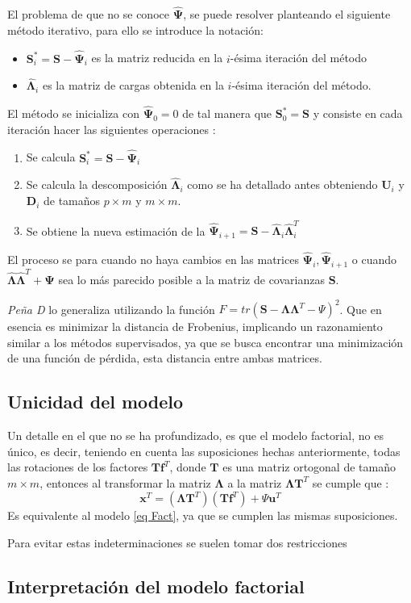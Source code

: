 \noindent El problema de que no se conoce $\mathbf{\hat{\Psi}}$, se puede resolver planteando el siguiente método iterativo, para ello se introduce la notación:
\begin{itemize}
\item $\mathbf{S}_i^*=\mathbf{S}-\hat{\mathbf{\Psi}}_i$ es la matriz reducida en la $i$-ésima iteración del método
\item $\mathbf{\hat{\Lambda}}_i$ es la matriz de cargas obtenida en la $i$-ésima iteración del método. 
\end{itemize}
\noindent El método se inicializa con $\mathbf{\hat{\Psi}}_0=0$ de tal manera que $\mathbf{S}_0^*=\mathbf{S}$ y consiste en cada iteración hacer las siguientes operaciones \cite{Johnson 2007, Peña 2002, Cuadras 2014}: 
\begin{enumerate}
\item Se calcula $\mathbf{S}_i^*=\mathbf{S-\hat{\Psi}}_i$
\item Se calcula la descomposición $\mathbf{\hat{\Lambda}}_i$ como se ha detallado antes obteniendo $\mathbf{U}_i$ y $\mathbf{D}_i$ de tamaños $p\times m $ y $m\times m$. 
\item Se obtiene la nueva estimación de la $\mathbf{\hat{\Psi}}_{i+1}=\mathbf{S}-\mathbf{\hat{\Lambda}}_i\mathbf{\hat{\Lambda}}_i^T$
\end{enumerate}

\noindent El proceso se para cuando no haya cambios en las matrices $\mathbf{\hat{\Psi}}_i,\mathbf{\hat{\Psi}}_{i+1}$ o cuando $\mathbf{\hat{\Lambda}}\mathbf{\hat{\Lambda}}^T+\mathbf{\Psi}$ sea lo más parecido posible a la matriz de covarianzas $\mathbf{S}$.

\noindent \emph{Peña D} \cite{Peña 2002} lo generaliza utilizando la función $F=tr(\mathbf{S}-\mathbf{\Lambda}\mathbf{\Lambda}^T-\Psi)^2$. Que en esencia es minimizar la distancia de Frobenius, implicando un razonamiento similar a los métodos supervisados, ya que se busca encontrar una minimización de una función de pérdida, esta distancia entre ambas matrices. 


\subsection{Unicidad del modelo}

\noindent Un detalle en el que no se ha profundizado, es que el modelo factorial, no es único, es decir, teniendo en cuenta las suposiciones hechas anteriormente, todas las rotaciones de los factores $\mathbf{Tf}^T$, donde $\mathbf{T}$ es una matriz ortogonal de tamaño $m\times m$, entonces al transformar la matriz $\mathbf{\Lambda}$ a la matriz $\mathbf{\Lambda T}^T$ se cumple que \cite{Mardia 1979}:
\begin{equation}
\mathbf{x}^T=(\mathbf{\Lambda T}^T)(\mathbf{Tf}^T)+\Psi\mathbf{u}^T
\end{equation}
\noindent Es equivalente al modelo \ref{eq Fact}, ya que se cumplen las mismas suposiciones. 

\noindent Para evitar estas indeterminaciones se suelen tomar dos restricciones 
\subsection{Interpretación del modelo factorial}